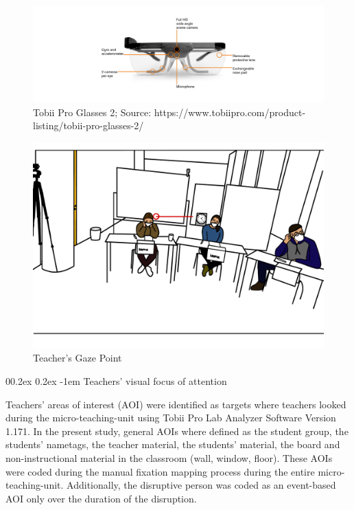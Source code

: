 \documentclass[
  man]{apa6}
\makeatletter
\let\oldparagraph\paragraph
\renewcommand{\paragraph}[1]{\oldparagraph{#1}\mbox{}}
\renewcommand{\paragraph}{\@startsection{paragraph}{4}{\parindent}%
  {0\baselineskip \@plus 0.2ex \@minus 0.2ex}%
  {-1em}%
  {\normalfont\normalsize\bfseries\itshape\typesectitle}}
\makeatother
\begin{document}
\begin{figure}

{\centering \includegraphics[width=14.07in]{./pictures/tobiiglasses2} 

}

\caption{Tobii Pro Glasses 2; Source: https://www.tobiipro.com/product-listing/tobii-pro-glasses-2/}\label{fig:tobiiglasses2}
\end{figure}

\begin{figure}

{\centering \includegraphics{./pictures/teachersgaze} 

}

\caption{Teacher's Gaze Point}\label{fig:teachersgaze}
\end{figure}

\paragraph{Teachers' visual focus of attention}\label{teachers-visual-focus-of-attention}

Teachers' areas of interest (AOI) were identified as targets where teachers looked during the micro-teaching-unit using Tobii Pro Lab Analyzer Software Version 1.171. In the present study, general AOIs where defined as the student group, the students' nametags, the teacher material, the students' material, the board and non-instructional material in the classroom (wall, window, floor). These AOIs were coded during the manual fixation mapping process during the entire micro-teaching-unit. Additionally, the disruptive person was coded as an event-based AOI only over the duration of the disruption.
\end{document}
